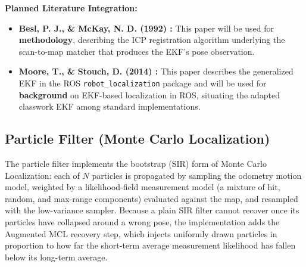 \documentclass[conf]{new-aiaa}
\begin{document}
\vspace{0.5em}\noindent\textbf{Planned Literature Integration:}
\begin{itemize}
    \item \textbf{Besl, P. J., \& McKay, N. D. (1992) \cite{besl1992method}:} This paper will be used for \textbf{methodology}, describing the ICP registration algorithm underlying the scan-to-map matcher that produces the EKF's pose observation.
    \item \textbf{Moore, T., \& Stouch, D. (2014) \cite{moore2014generalized}:} This paper describes the generalized EKF in the ROS \texttt{robot\_localization} package and will be used for \textbf{background} on EKF-based localization in ROS, situating the adapted classwork EKF among standard implementations.
\end{itemize}

\subsection{Particle Filter (Monte Carlo Localization)}\label{sec:PF}
The particle filter implements the bootstrap (SIR) form of Monte Carlo Localization: each of $N$ particles is propagated by sampling the odometry motion model, weighted by a likelihood-field measurement model (a mixture of hit, random, and max-range components) evaluated against the map, and resampled with the low-variance sampler. Because a plain SIR filter cannot recover once its particles have collapsed around a wrong pose, the implementation adds the Augmented MCL recovery step, which injects uniformly drawn particles in proportion to how far the short-term average measurement likelihood has fallen below its long-term average.
\end{document}
